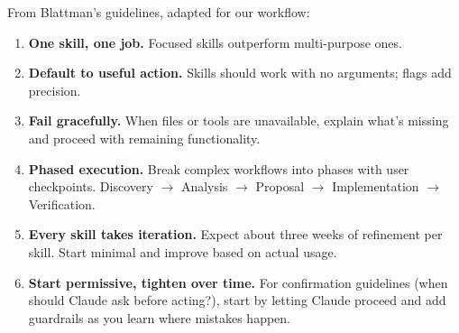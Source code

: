 From Blattman's guidelines, adapted for our workflow:

\begin{enumerate}
	\item \textbf{One skill, one job.}
	Focused skills outperform multi-purpose ones.
	\item \textbf{Default to useful action.}
	Skills should work with no arguments; flags add precision.
	\item \textbf{Fail gracefully.}
	When files or tools are unavailable, explain what's missing
	and proceed with remaining functionality.
	\item \textbf{Phased execution.}
	Break complex workflows into phases with user checkpoints.
	Discovery $\to$ Analysis $\to$ Proposal $\to$ Implementation $\to$ Verification.
	\item \textbf{Every skill takes iteration.}
	Expect about three weeks of refinement per skill.
	Start minimal and improve based on actual usage.
	\item \textbf{Start permissive, tighten over time.}
	For confirmation guidelines (when should Claude ask before acting?),
	start by letting Claude proceed and add guardrails as you learn
	where mistakes happen.
\end{enumerate}
